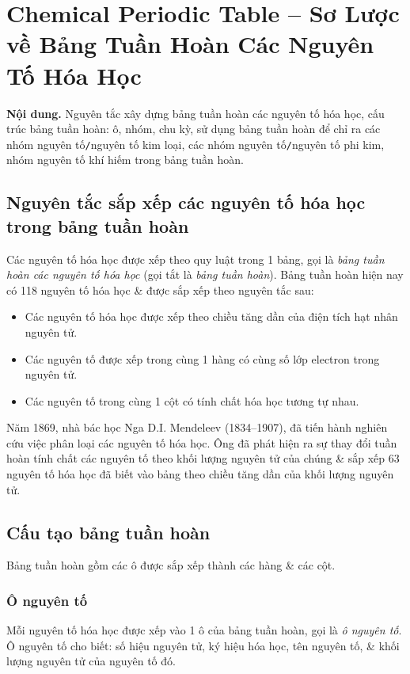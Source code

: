 \documentclass{article}
\begin{document}

\section{Chemical Periodic Table -- Sơ Lược về Bảng Tuần Hoàn Các Nguyên Tố Hóa Học}
\textsf{\textbf{Nội dung.} Nguyên tắc xây dựng bảng tuần hoàn các nguyên tố hóa học, cấu trúc bảng tuần hoàn: ô, nhóm, chu kỳ, sử dụng bảng tuần hoàn để chỉ ra các nhóm nguyên tố\texttt{/}nguyên tố kim loại, các nhóm nguyên tố\texttt{/}nguyên tố phi kim, nhóm nguyên tố khí hiếm trong bảng tuần hoàn.}

\subsection{Nguyên tắc sắp xếp các nguyên tố hóa học trong bảng tuần hoàn}
Các nguyên tố hóa học được xếp theo quy luật trong 1 bảng, gọi là \textit{bảng tuần hoàn các nguyên tố hóa học} (gọi tắt là \textit{bảng tuần hoàn}). Bảng tuần hoàn hiện nay có 118 nguyên tố hóa học \& được sắp xếp theo nguyên tắc sau:
\begin{itemize}
	\item Các nguyên tố hóa học được xếp theo chiều tăng dần của điện tích hạt nhân nguyên tử.
	\item Các nguyên tố được xếp trong cùng 1 hàng có cùng số lớp electron trong nguyên tử.
	\item Các nguyên tố trong cùng 1 cột có tính chất hóa học tương tự nhau.
\end{itemize}
Năm 1869, nhà bác học Nga D.I. Mendeleev (1834--1907), đã tiến hành nghiên cứu việc phân loại các nguyên tố hóa học. Ông đã phát hiện ra sự thay đổi tuần hoàn tính chất các nguyên tố theo khối lượng nguyên tử của chúng \& sắp xếp 63 nguyên tố hóa học đã biết vào bảng theo chiều tăng dần của khối lượng nguyên tử.

\subsection{Cấu tạo bảng tuần hoàn}
Bảng tuần hoàn gồm các ô được sắp xếp thành các hàng \& các cột.

\subsubsection{Ô nguyên tố}
Mỗi nguyên tố hóa học được xếp vào 1 ô của bảng tuần hoàn, gọi là \textit{ô nguyên tố}. Ô nguyên tố cho biết: số hiệu nguyên tử, ký hiệu hóa học, tên nguyên tố, \& khối lượng nguyên tử của nguyên tố đó.
\end{document}
